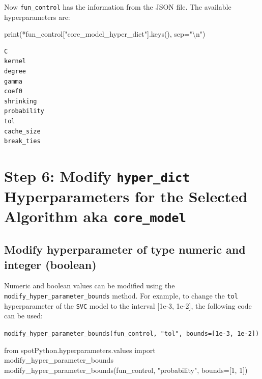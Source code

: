 \documentclass[
  letterpaper,
  DIV=11,
  numbers=noendperiod]{scrreprt}
\newenvironment{Shaded}{\begin{snugshade}}{\end{snugshade}}
\newcommand{\BuiltInTok}[1]{\textcolor[rgb]{0.00,0.23,0.31}{#1}}
\newcommand{\CharTok}[1]{\textcolor[rgb]{0.13,0.47,0.30}{#1}}
\newcommand{\DecValTok}[1]{\textcolor[rgb]{0.68,0.00,0.00}{#1}}
\newcommand{\ImportTok}[1]{\textcolor[rgb]{0.00,0.46,0.62}{#1}}
\newcommand{\NormalTok}[1]{\textcolor[rgb]{0.00,0.23,0.31}{#1}}
\newcommand{\OperatorTok}[1]{\textcolor[rgb]{0.37,0.37,0.37}{#1}}
\newcommand{\StringTok}[1]{\textcolor[rgb]{0.13,0.47,0.30}{#1}}
\begin{document}
Now \texttt{fun\_control} has the information from the JSON file. The
available hyperparameters are:

\begin{Shaded}
\begin{Highlighting}[]
\BuiltInTok{print}\NormalTok{(}\OperatorTok{*}\NormalTok{fun\_control[}\StringTok{"core\_model\_hyper\_dict"}\NormalTok{].keys(), sep}\OperatorTok{=}\StringTok{"}\CharTok{\textbackslash{}n}\StringTok{"}\NormalTok{)}
\end{Highlighting}
\end{Shaded}

\begin{verbatim}
C
kernel
degree
gamma
coef0
shrinking
probability
tol
cache_size
break_ties
\end{verbatim}

\hypertarget{step-6-modify-hyper_dict-hyperparameters-for-the-selected-algorithm-aka-core_model-3}{%
\section{\texorpdfstring{Step 6: Modify \texttt{hyper\_dict}
Hyperparameters for the Selected Algorithm aka
\texttt{core\_model}}{Step 6: Modify hyper\_dict Hyperparameters for the Selected Algorithm aka core\_model}}\label{step-6-modify-hyper_dict-hyperparameters-for-the-selected-algorithm-aka-core_model-3}}

\hypertarget{modify-hyperparameter-of-type-numeric-and-integer-boolean-3}{%
\subsection{Modify hyperparameter of type numeric and integer
(boolean)}\label{modify-hyperparameter-of-type-numeric-and-integer-boolean-3}}

Numeric and boolean values can be modified using the
\texttt{modify\_hyper\_parameter\_bounds} method. For example, to change
the \texttt{tol} hyperparameter of the \texttt{SVC} model to the
interval {[}1e-3, 1e-2{]}, the following code can be used:

\texttt{modify\_hyper\_parameter\_bounds(fun\_control,\ "tol",\ bounds={[}1e-3,\ 1e-2{]})}

\begin{Shaded}
\begin{Highlighting}[]
\ImportTok{from}\NormalTok{ spotPython.hyperparameters.values }\ImportTok{import}\NormalTok{ modify\_hyper\_parameter\_bounds}
\NormalTok{modify\_hyper\_parameter\_bounds(fun\_control, }\StringTok{"probability"}\NormalTok{, bounds}\OperatorTok{=}\NormalTok{[}\DecValTok{1}\NormalTok{, }\DecValTok{1}\NormalTok{])}
\end{Highlighting}
\end{Shaded}
\end{document}
